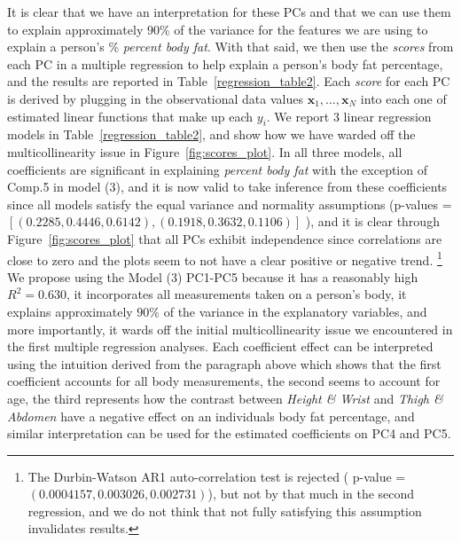 \documentclass[letterpaper, 12pt]{article}
\begin{document}
	It is clear that we have an interpretation for these PCs and that we can use them to explain approximately $90 \%$ of the variance for the features we are using to explain a person's \% \textit{percent body fat}.  With that said, we then use the \textit{scores} from each PC in a multiple regression to help explain a person's body fat percentage, and the results are reported in Table~\ref{regression_table2}.  Each \textit{score} for each PC is derived by plugging in the observational data values $\textbf{x}_{1},\dots,\textbf{x}_{N}$ into each one of estimated linear functions that make up each $y_{i}$.  We report 3 linear regression models in Table~\ref{regression_table2}, and show how we have warded off the multicollinearity issue in Figure~\ref{fig:scores_plot}.  In all three models, all coefficients are significant in explaining \textit{percent body fat} with the exception of Comp.5 in model (3), and it is now valid to take inference from these coefficients since all models satisfy the equal variance and normality assumptions (p-values = $\left[(0.2285,0.4446,0.6142),(0.1918,0.3632,0.1106)\right]$ ), and it is clear through Figure~\ref{fig:scores_plot} that all PCs exhibit independence since correlations are close to zero and the plots seem to not have a clear positive or negative trend. \footnote{The Durbin-Watson AR1 auto-correlation test is rejected ( p-value = $(0.0004157,0.003026,0.002731)$), but not by that much in the second regression, and we do not think that not fully satisfying this assumption invalidates results.}  We propose using the Model (3) PC1-PC5 because it has a reasonably high $R^{2} = 0.630$, it incorporates all measurements taken on a person's body, it explains approximately $90 \%$ of the variance in the explanatory variables, and more importantly, it wards off the initial multicollinearity issue we encountered in the first multiple regression analyses.  Each coefficient effect can be interpreted using the intuition derived from the paragraph above which shows that the first coefficient accounts for all body measurements, the second seems to account for age, the third represents how the contrast between \textit{Height \& Wrist} and \textit{Thigh \& Abdomen} have a negative effect on an individuals body fat percentage, and similar interpretation can be used for the estimated coefficients on PC4 and PC5.
\end{document}
